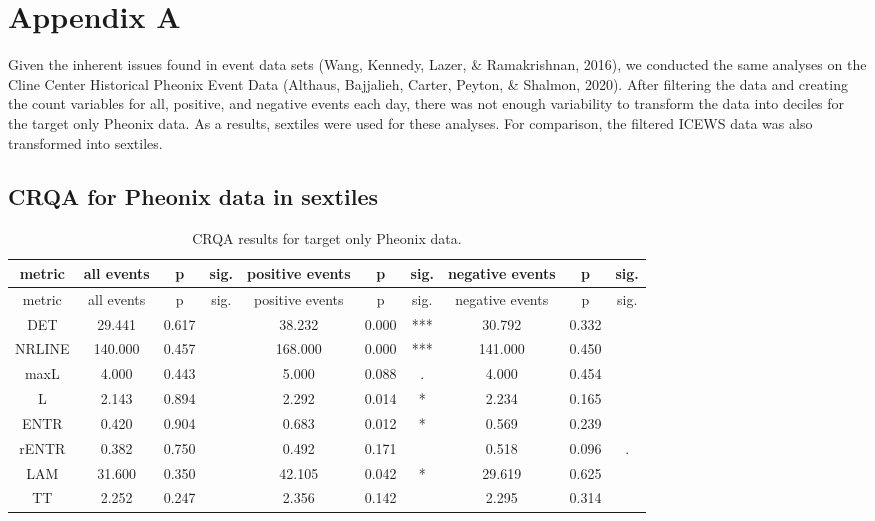 \documentclass[english,man]{apa6}
\begin{document}
\endgroup

\newpage

\hypertarget{appendix-a}{%
\section{Appendix A}\label{appendix-a}}

Given the inherent issues found in event data sets (Wang, Kennedy, Lazer, \& Ramakrishnan, 2016), we conducted the same analyses on the Cline Center Historical Pheonix Event Data (Althaus, Bajjalieh, Carter, Peyton, \& Shalmon, 2020). After filtering the data and creating the count variables for all, positive, and negative events each day, there was not enough variability to transform the data into deciles for the target only Pheonix data. As a results, sextiles were used for these analyses. For comparison, the filtered ICEWS data was also transformed into sextiles.

\hypertarget{crqa-for-pheonix-data-in-sextiles}{%
\subsection{CRQA for Pheonix data in sextiles}\label{crqa-for-pheonix-data-in-sextiles}}

\begin{longtable}[]{@{}cccccccccc@{}}
\caption{CRQA results for target only Pheonix data.}\tabularnewline
\toprule
metric & all events & p & sig. & positive events & p & sig. & negative events & p & sig.\tabularnewline
\midrule
\endfirsthead
\toprule
metric & all events & p & sig. & positive events & p & sig. & negative events & p & sig.\tabularnewline
\midrule
\endhead
DET & 29.441 & 0.617 & & 38.232 & 0.000 & *** & 30.792 & 0.332 &\tabularnewline
NRLINE & 140.000 & 0.457 & & 168.000 & 0.000 & *** & 141.000 & 0.450 &\tabularnewline
maxL & 4.000 & 0.443 & & 5.000 & 0.088 & . & 4.000 & 0.454 &\tabularnewline
L & 2.143 & 0.894 & & 2.292 & 0.014 & * & 2.234 & 0.165 &\tabularnewline
ENTR & 0.420 & 0.904 & & 0.683 & 0.012 & * & 0.569 & 0.239 &\tabularnewline
rENTR & 0.382 & 0.750 & & 0.492 & 0.171 & & 0.518 & 0.096 & .\tabularnewline
LAM & 31.600 & 0.350 & & 42.105 & 0.042 & * & 29.619 & 0.625 &\tabularnewline
TT & 2.252 & 0.247 & & 2.356 & 0.142 & & 2.295 & 0.314 &\tabularnewline
\bottomrule
\end{longtable}
\end{document}
